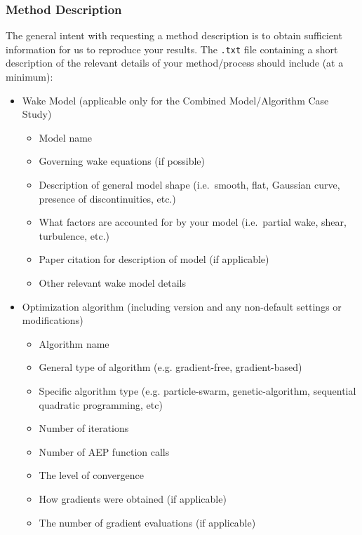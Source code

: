 \documentclass[12pt]{article}
\begin{document}
        \subsubsection{Method Description}\label{sec:MethodDesc}
        	The general intent with requesting a method description is to obtain sufficient information for us to reproduce your results. The \texttt{.txt} file containing a short description of the relevant details of your method/process should include (at a minimum):
            \begin{itemize}
                \item Wake Model (applicable only for the Combined Model/Algorithm Case Study)
                \begin{itemize}
                    \item Model name
                    \item Governing wake equations (if possible)
                    \item Description of general model shape (i.e.~smooth, flat, Gaussian curve, presence of discontinuities, etc.)
                    \item What factors are accounted for by your model (i.e.~partial wake, shear, turbulence, etc.)
                    \item Paper citation for description of model (if applicable)
                    \item Other relevant wake model details
                \end{itemize}
                \item Optimization algorithm (including version and any non-default settings or modifications)
                \begin{itemize}
                	\item Algorithm name
                    \item General type of algorithm (e.g. gradient-free, gradient-based)
                    \item Specific algorithm type (e.g. particle-swarm, genetic-algorithm, sequential quadratic programming, etc)
                    \item Number of iterations
                    \item Number of AEP function calls
                    \item The level of convergence
                    \item How gradients were obtained (if applicable)
                    \item The number of gradient evaluations (if applicable)

\end{itemize}
\end{itemize}
\end{document}
